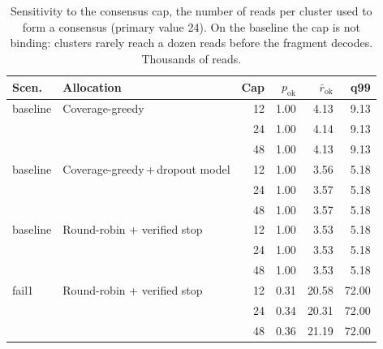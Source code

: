 \begin{table}[!t]
\centering
\caption{Sensitivity to the consensus cap, the number of reads per cluster used to form a consensus (primary value 24).  On the baseline the cap is not binding: clusters rarely reach a dozen reads before the fragment decodes.  Thousands of reads.}
\label{tab:r4cap}
\scriptsize
\setlength{\tabcolsep}{3pt}
\begin{tabular}{@{}llrrrr@{}}
\toprule
Scen. & Allocation & Cap & $p_{\text{ok}}$ & $\bar r_{\text{ok}}$ & q99 \\
\midrule
baseline & Coverage-greedy & 12 & 1.00 & 4.13 & 9.13 \\
 &  & 24 & 1.00 & 4.14 & 9.13 \\
 &  & 48 & 1.00 & 4.13 & 9.13 \\
\midrule
baseline & Coverage-greedy\,+\,dropout model & 12 & 1.00 & 3.56 & 5.18 \\
 &  & 24 & 1.00 & 3.57 & 5.18 \\
 &  & 48 & 1.00 & 3.57 & 5.18 \\
\midrule
baseline & Round-robin + verified stop & 12 & 1.00 & 3.53 & 5.18 \\
 &  & 24 & 1.00 & 3.53 & 5.18 \\
 &  & 48 & 1.00 & 3.53 & 5.18 \\
\midrule
fail1 & Round-robin + verified stop & 12 & 0.31 & 20.58 & 72.00 \\
 &  & 24 & 0.34 & 20.31 & 72.00 \\
 &  & 48 & 0.36 & 21.19 & 72.00 \\
\bottomrule
\end{tabular}
\end{table}
